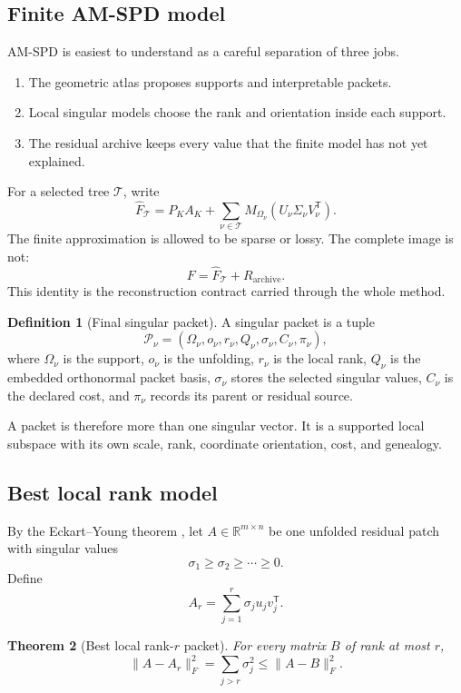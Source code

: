 \documentclass[11pt]{article}
\newtheorem{theorem}{Theorem}[section]
\theoremstyle{definition}
\newtheorem{definition}[theorem]{Definition}
\theoremstyle{remark}
\newcommand{\R}{\mathbb R}
\begin{document}
\subsection{Finite AM-SPD model}
AM-SPD is easiest to understand as a careful separation of three jobs.

\begin{enumerate}
\item The geometric atlas proposes supports and interpretable packets.
\item Local singular models choose the rank and orientation inside each support.
\item The residual archive keeps every value that the finite model has not yet explained.
\end{enumerate}

For a selected tree $\mathcal T$, write
\[
\widehat F_{\mathcal T}
=
P_KA_K
+
\sum_{\nu\in\mathcal T}
M_{\Omega_\nu}
\left(
U_\nu\Sigma_\nu V_\nu^{\mathsf T}
\right).
\]
The finite approximation is allowed to be sparse or lossy. The complete image is not:
\[
\boxed{
F=\widehat F_{\mathcal T}+R_{\mathrm{archive}}.
}
\]
This identity is the reconstruction contract carried through the whole method.

\begin{definition}[Final singular packet]
A singular packet is a tuple
\[
\mathcal P_\nu
=
(\Omega_\nu,o_\nu,r_\nu,Q_\nu,\sigma_\nu,C_\nu,\pi_\nu),
\]
where $\Omega_\nu$ is the support, $o_\nu$ is the unfolding, $r_\nu$ is the local rank, $Q_\nu$ is the embedded orthonormal packet basis, $\sigma_\nu$ stores the selected singular values, $C_\nu$ is the declared cost, and $\pi_\nu$ records its parent or residual source.
\end{definition}

A packet is therefore more than one singular vector. It is a supported local subspace with its own scale, rank, coordinate orientation, cost, and genealogy.

\FloatBarrier
\subsection{Best local rank model}
By the Eckart--Young theorem \cite{EckartYoung}, let $A\in\R^{m\times n}$ be one unfolded residual patch with singular values
\[
\sigma_1\ge\sigma_2\ge\cdots\ge0.
\]
Define
\[
A_r=\sum_{j=1}^{r}\sigma_j u_jv_j^{\mathsf T}.
\]

\begin{theorem}[Best local rank-$r$ packet]
For every matrix $B$ of rank at most $r$,
\[
\boxed{
\|A-A_r\|_F^2
=
\sum_{j>r}\sigma_j^2
\le
\|A-B\|_F^2.
}
\]
\end{theorem}
\end{document}
